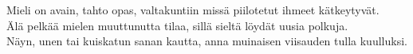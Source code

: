 \documentclass{article}
\begin{document}
\begin{infobox}
Mieli on avain, tahto opas, valtakuntiin missä piilotetut ihmeet kätkeytyvät.\\
Älä pelkää mielen muuttunutta tilaa, sillä sieltä löydät uusia polkuja.\\
Näyn, unen tai kuiskatun sanan kautta, anna muinaisen viisauden tulla kuulluksi.
\end{infobox}
\end{document}
